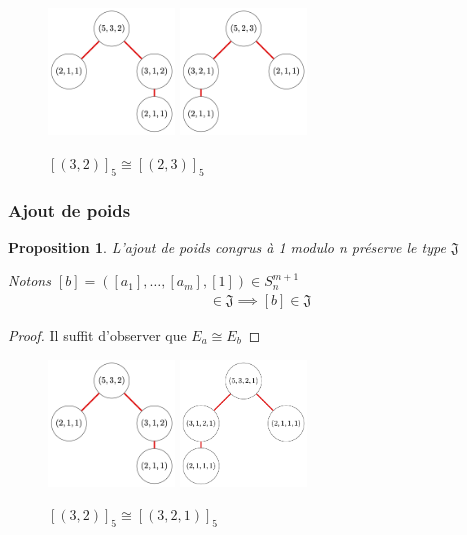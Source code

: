 \documentclass{article}
\newtheorem{proposition}{Proposition}
\begin{document}
\begin{figure}[h]
    \caption{${[(3, 2)]}_5 \cong {[(2, 3)]}_5$}
    \centering
    \includegraphics[width=0.3\textwidth]{532}
    \includegraphics[width=0.3\textwidth]{523}
\end{figure}

\subsubsection{Ajout de poids}

\begin{proposition}
    L'ajout de poids congrus à 1 modulo n préserve le type $\mathfrak{J}$

    Notons $[b] = ([a_1], \dots, [a_m], [1]) \in S_n^{m+1}$
    \begin{align*}
        [a] \in \mathfrak{J} \implies [b] \in \mathfrak{J}
    \end{align*}
\end{proposition}

\begin{proof}
    Il suffit d'observer que $E_a \cong E_b$
\end{proof}

\begin{figure}[h]
    \caption{${[(3, 2)]}_5 \cong {[(3, 2, 1)]}_5$}
    \centering
    \includegraphics[width=0.3\textwidth]{532}
    \includegraphics[width=0.3\textwidth]{5321}
\end{figure}
\end{document}
